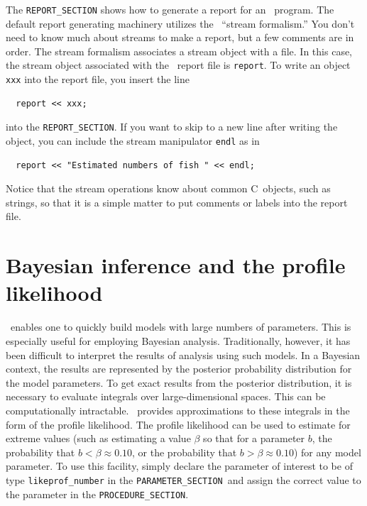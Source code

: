\documentclass{admbmanual}
\newcommand\PS{\texttt{PARAMETER\_SECTION}}
\newcommand\PROS{\texttt{PROCEDURE\_SECTION}}
\newcommand\apl{profile likelihood}
\begin{document}
The \texttt{REPORT\_SECTION} shows how to generate a report
for an \ADM\ program.  The default report generating machinery
utilizes the \cplus\ ``stream formalism.'' You don't need to know much
about streams to make a report, but a few comments are in order. 
The stream formalism associates a stream object with
a file. In this case, the stream object associated with
the \ADM\ report file is \texttt{report}. To write an object
\texttt{xxx} into the report file, you insert the line 
\begin{lstlisting}
  report << xxx;
\end{lstlisting}
into the \texttt{REPORT\_SECTION}.
If you want to skip to a new line after writing the object, you can 
include the stream manipulator \texttt{endl} as in
\begin{lstlisting}
  report << "Estimated numbers of fish " << endl;
\end{lstlisting}
Notice that the stream operations know about
common C~objects, such as strings, so that it is a simple matter
to put comments or labels into the report file.


\section{Bayesian inference and the \apl}\label{sec:bayesian-inference}

\ADM\ enables one to quickly build models with large numbers of
parameters.  This is especially useful for employing
Bayesian analysis. Traditionally, however, it has been difficult to
interpret the results of analysis using such models.
In a Bayesian context, the results are represented
by the posterior probability distribution for the
model parameters. To get exact results from
the posterior distribution, it is necessary to evaluate
integrals over large-dimensional spaces.  This can be computationally
intractable.  \ADM\ provides
approximations to these
integrals in the form of the profile likelihood. The
profile likelihood can be used to 
estimate for extreme values 
(such as estimating a value $\beta$ so that for a 
parameter $b$, the probability that $b<\beta \approx 0.10$,
or the probability that $b>\beta \approx 0.10$) for
any model parameter.
To use this facility, simply declare the parameter of interest
to be of type \texttt{likeprof\_number} in the \PS\ and assign
the correct value to the parameter in the \PROS.
\end{document}
